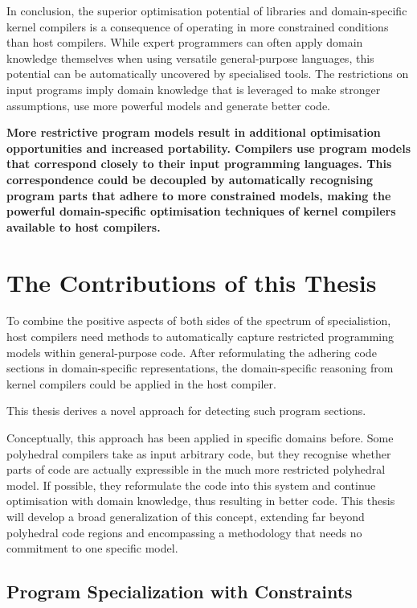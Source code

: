     In conclusion, the superior optimisation potential of libraries and
    domain-specific kernel compilers is a consequence of operating in more
    constrained conditions than host compilers.
    While expert programmers can often apply domain knowledge themselves
    when using versatile general-purpose languages, this potential can be
    automatically uncovered by specialised tools.
    The restrictions on input programs imply domain knowledge that is leveraged
    to make stronger assumptions, use more powerful models and generate better
    code.

    {\bf
    More restrictive program models result in additional optimisation
    opportunities and increased portability.
    Compilers use program models that correspond closely to their input
    programming languages.
    This correspondence could be decoupled by automatically recognising program
    parts that adhere to more constrained models, making the powerful
    domain-specific optimisation techniques of kernel compilers available to
    host compilers.
    }

\section{The Contributions of this Thesis}

    To combine the positive aspects of both sides of the spectrum of
    specialistion, host compilers need methods to automatically capture
    restricted programming models within general-purpose code.
    After reformulating the adhering code sections in domain-specific
    representations, the domain-specific reasoning from kernel compilers could
    be applied in the host compiler.

    This thesis derives a novel approach for detecting such program sections.

    Conceptually, this approach has been applied in specific domains before.
    Some polyhedral compilers take as input arbitrary code, but they recognise
    whether parts of code are actually expressible in the much more restricted
    polyhedral model.
    If possible, they reformulate the code into this system and continue
    optimisation with domain knowledge, thus resulting in better code.
    This thesis will develop a broad generalization of this concept, extending
    far beyond polyhedral code regions and encompassing a methodology that
    needs no commitment to one specific model.

\subsection{Program Specialization with Constraints}

